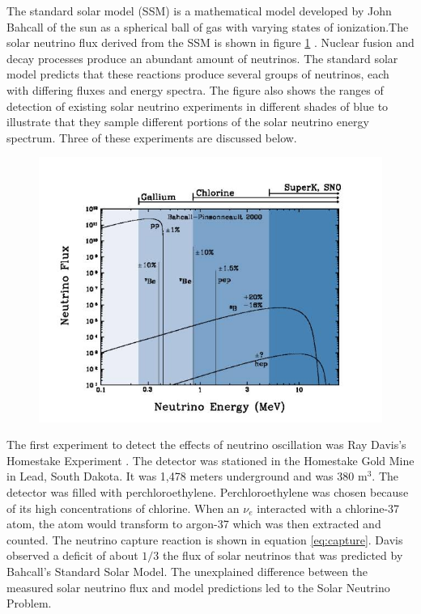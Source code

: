 The standard solar model (SSM) is a mathematical model developed by John Bahcall of the sun as a spherical ball of gas with varying states of ionization.The solar neutrino flux derived from the SSM is shown in figure \ref{fig:solarmodel} \cite{bahcall2}. Nuclear fusion and decay processes produce an abundant amount of neutrinos. The standard solar model predicts that these reactions produce several groups of neutrinos, each with differing fluxes and energy spectra. The figure also shows the ranges of detection of existing solar neutrino experiments in different shades of blue to illustrate that they sample different portions of the solar neutrino energy spectrum. Three of these experiments are discussed below.

\begin{figure}[htp]
\centering
\includegraphics[scale=.55]{figs/solarmodel.jpg}
\label{fig:solarmodel}
\end{figure}

The first experiment to detect the effects of neutrino oscillation was Ray Davis's Homestake Experiment \cite{raydavis}. The detector was stationed in the Homestake Gold Mine in Lead, South Dakota. It was 1,478 meters underground and was 380 $\text{m}^3$. The detector was filled with perchloroethylene. Perchloroethylene was chosen because of its high concentrations of chlorine. When an $\nu_{e}$ interacted with a chlorine-37 atom, the atom would transform to argon-37 which was then extracted and counted. The neutrino capture reaction is shown in equation \ref{eq:capture}. Davis observed a deficit of about $1/3$ the flux of solar neutrinos that was predicted by Bahcall's Standard Solar Model. The unexplained difference between the measured solar neutrino flux and model predictions led to the Solar Neutrino Problem.

